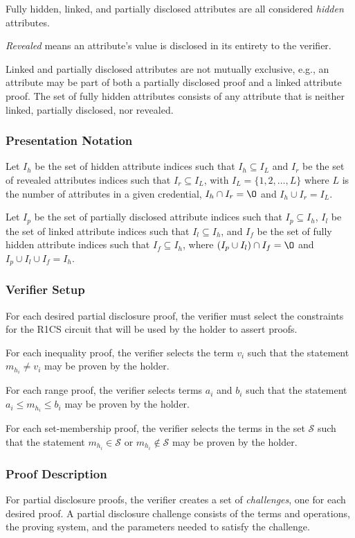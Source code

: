\documentclass[a4paper]{article}
\begin{document}
Fully hidden, linked, and partially disclosed attributes are all considered \emph{hidden} attributes.

\emph{Revealed} means an attribute's value is disclosed in its entirety to the verifier.

Linked and partially disclosed attributes are not mutually exclusive, e.g., an attribute may be part of both a partially disclosed proof and a linked attribute proof. The set of fully hidden attributes consists of any attribute that is neither linked, partially disclosed, nor revealed.


\subsubsection{Presentation Notation}
Let $I_h$ be the set of hidden attribute indices such that $I_h \subseteq I_L$ and $I_r$ be the set of revealed attributes indices such that $I_r \subseteq I_L$, with $I_L = \{1, 2, \ldots,L\}$ where $L$ is the number of attributes in a given credential, $I_h \cap I_r = \O$ and $I_h \cup I_r = I_L$.

Let $I_p$ be the set of partially disclosed attribute indices such that $I_p \subseteq I_h$, $I_l$ be the set of linked attribute indices such that $I_l \subseteq I_h$, and $I_f$ be the set of fully hidden attribute indices such that $I_f \subseteq I_h$, where $(I_p \cup I_l) \cap I_f = \O$ and $I_p \cup I_l \cup I_f = I_h$.

\subsubsection{Verifier Setup}
For each desired partial disclosure proof, the verifier must select the constraints for the R1CS circuit that will be used by the holder to assert proofs.

For each inequality proof, the verifier selects the term $v_i$ such that the statement $m_{h_i} \neq v_i$ may be proven by the holder.

For each range proof, the verifier selects terms $a_i$ and $b_i$ such that the statement $a_i \leq m_{h_i} \leq b_i$ may be proven by the holder.

For each set-membership proof, the verifier selects the terms in the set $\mathcal{S}$ such that the statement $m_{h_i} \in \mathcal{S}$ or $m_{h_i} \notin \mathcal{S}$ may be proven by the holder.


\subsubsection{Proof Description}
For partial disclosure proofs, the verifier creates a set of \emph{challenges}, one for each desired proof. A partial disclosure challenge consists of the terms and operations, the proving system, and the parameters needed to satisfy the challenge.
\end{document}
